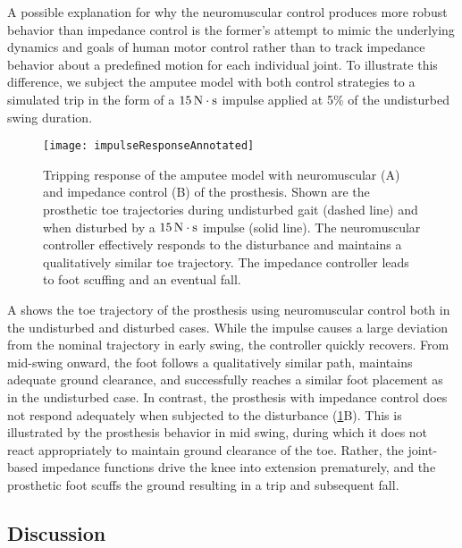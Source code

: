 A possible explanation for why the neuromuscular control produces more robust
behavior than impedance control is the former's attempt to mimic the underlying
dynamics and goals of human motor control rather than to track impedance
behavior about a predefined motion for each individual joint. To illustrate this
difference, we subject the amputee model with both control strategies to a
simulated trip in the form of a $\unit[15]{N \cdot s}$ impulse applied at 5\% of
the undisturbed swing duration. 

\begin{figure*}[t]
    \centering
    \texttt{[image: impulseResponseAnnotated]}
    \caption{Tripping response of the amputee model with neuromuscular (A) and
    impedance control (B) of the prosthesis. Shown are the prosthetic toe
    trajectories during undisturbed gait (dashed line) and when disturbed by a
    $\unit[15]{N \cdot s}$ impulse (solid line). The neuromuscular controller
    effectively responds to the disturbance and maintains a qualitatively
    similar toe trajectory. The impedance controller leads to foot scuffing and
    an eventual fall.
    }\label{fig:ImpulseResponses}
\end{figure*}

A shows the toe trajectory of the prosthesis using
neuromuscular control both in the undisturbed and disturbed cases. While the
impulse causes a large deviation from the nominal trajectory in early swing, the
controller quickly recovers. From mid-swing onward, the foot follows a
qualitatively similar path, maintains adequate ground clearance, and
successfully reaches a similar foot placement as in the undisturbed case. In
contrast, the prosthesis with impedance control does not respond adequately when
subjected to the disturbance (\cref{fig:ImpulseResponses}B). This is illustrated
by the prosthesis behavior in mid swing, during which it does not react
appropriately to maintain ground clearance of the toe. Rather, the joint-based
impedance functions drive the knee into extension prematurely, and the
prosthetic foot scuffs the ground resulting in a trip and subsequent fall.

\subsection{Discussion}\label{sec:completed_comparison_discuss}

